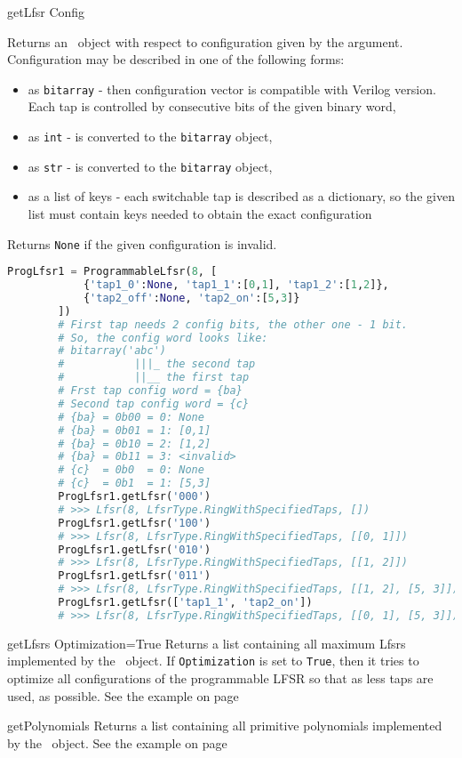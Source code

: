  {getLfsr} {Config} {
	Returns an \Lfsr\ object with respect to configuration given by the argument. Configuration may be described in one of the following forms:
	\begin{itemize}
		\item as \texttt{bitarray} - then configuration vector is compatible with Verilog version. Each tap is controlled by consecutive bits of the given binary word,
		\item as \texttt{int} - is converted to the \texttt{bitarray} object,
		\item as \texttt{str} - is converted to the \texttt{bitarray} object,
		\item as a list of keys - each switchable tap is described as a dictionary, so the given list must contain keys needed to obtain the exact configuration
	\end{itemize}
	Returns \texttt{None} if the given configuration is invalid.
}
\begin{lstlisting}[language=Python]
		ProgLfsr1 = ProgrammableLfsr(8, [
			{'tap1_0':None, 'tap1_1':[0,1], 'tap1_2':[1,2]},
			{'tap2_off':None, 'tap2_on':[5,3]}
		])
		# First tap needs 2 config bits, the other one - 1 bit.
		# So, the config word looks like:
		# bitarray('abc')
		#           |||_ the second tap
		#           ||__ the first tap
		# Frst tap config word = {ba}
		# Second tap config word = {c}
		# {ba} = 0b00 = 0: None 
		# {ba} = 0b01 = 1: [0,1] 
		# {ba} = 0b10 = 2: [1,2] 
		# {ba} = 0b11 = 3: <invalid>
		# {c}  = 0b0  = 0: None
		# {c}  = 0b1  = 1: [5,3]
		ProgLfsr1.getLfsr('000')
		# >>> Lfsr(8, LfsrType.RingWithSpecifiedTaps, [])
		ProgLfsr1.getLfsr('100')
		# >>> Lfsr(8, LfsrType.RingWithSpecifiedTaps, [[0, 1]])
		ProgLfsr1.getLfsr('010')
		# >>> Lfsr(8, LfsrType.RingWithSpecifiedTaps, [[1, 2]])
		ProgLfsr1.getLfsr('011')
		# >>> Lfsr(8, LfsrType.RingWithSpecifiedTaps, [[1, 2], [5, 3]])
		ProgLfsr1.getLfsr(['tap1_1', 'tap2_on'])
		# >>> Lfsr(8, LfsrType.RingWithSpecifiedTaps, [[0, 1], [5, 3]])
\end{lstlisting}

 {getLfsrs} {Optimization=True} {
	Returns a list containing all maximum Lfsrs implemented by the \ProgrammableLfsr\ object. If \texttt{Optimization} is set to \texttt{True}, then it tries to optimize all configurations of the programmable LFSR so that as less taps are used, as possible.
	See the example on page \pageref{programmablelfsrexample}
}

 {getPolynomials} {} {
	Returns a list containing all primitive polynomials implemented by the \ProgrammableLfsr\ object.
	See the example on page \pageref{programmablelfsrexample}
}

